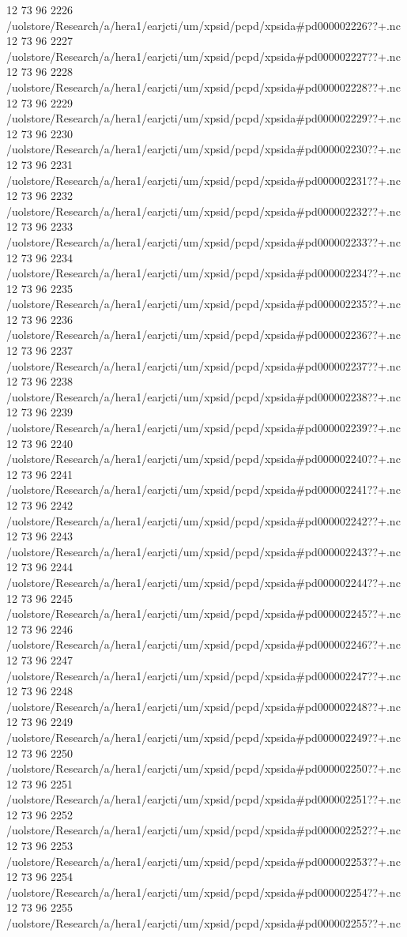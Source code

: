 12 73 96
2226
/uolstore/Research/a/hera1/earjcti/um/xpsid/pcpd/xpsida#pd000002226??+.nc
12 73 96
2227
/uolstore/Research/a/hera1/earjcti/um/xpsid/pcpd/xpsida#pd000002227??+.nc
12 73 96
2228
/uolstore/Research/a/hera1/earjcti/um/xpsid/pcpd/xpsida#pd000002228??+.nc
12 73 96
2229
/uolstore/Research/a/hera1/earjcti/um/xpsid/pcpd/xpsida#pd000002229??+.nc
12 73 96
2230
/uolstore/Research/a/hera1/earjcti/um/xpsid/pcpd/xpsida#pd000002230??+.nc
12 73 96
2231
/uolstore/Research/a/hera1/earjcti/um/xpsid/pcpd/xpsida#pd000002231??+.nc
12 73 96
2232
/uolstore/Research/a/hera1/earjcti/um/xpsid/pcpd/xpsida#pd000002232??+.nc
12 73 96
2233
/uolstore/Research/a/hera1/earjcti/um/xpsid/pcpd/xpsida#pd000002233??+.nc
12 73 96
2234
/uolstore/Research/a/hera1/earjcti/um/xpsid/pcpd/xpsida#pd000002234??+.nc
12 73 96
2235
/uolstore/Research/a/hera1/earjcti/um/xpsid/pcpd/xpsida#pd000002235??+.nc
12 73 96
2236
/uolstore/Research/a/hera1/earjcti/um/xpsid/pcpd/xpsida#pd000002236??+.nc
12 73 96
2237
/uolstore/Research/a/hera1/earjcti/um/xpsid/pcpd/xpsida#pd000002237??+.nc
12 73 96
2238
/uolstore/Research/a/hera1/earjcti/um/xpsid/pcpd/xpsida#pd000002238??+.nc
12 73 96
2239
/uolstore/Research/a/hera1/earjcti/um/xpsid/pcpd/xpsida#pd000002239??+.nc
12 73 96
2240
/uolstore/Research/a/hera1/earjcti/um/xpsid/pcpd/xpsida#pd000002240??+.nc
12 73 96
2241
/uolstore/Research/a/hera1/earjcti/um/xpsid/pcpd/xpsida#pd000002241??+.nc
12 73 96
2242
/uolstore/Research/a/hera1/earjcti/um/xpsid/pcpd/xpsida#pd000002242??+.nc
12 73 96
2243
/uolstore/Research/a/hera1/earjcti/um/xpsid/pcpd/xpsida#pd000002243??+.nc
12 73 96
2244
/uolstore/Research/a/hera1/earjcti/um/xpsid/pcpd/xpsida#pd000002244??+.nc
12 73 96
2245
/uolstore/Research/a/hera1/earjcti/um/xpsid/pcpd/xpsida#pd000002245??+.nc
12 73 96
2246
/uolstore/Research/a/hera1/earjcti/um/xpsid/pcpd/xpsida#pd000002246??+.nc
12 73 96
2247
/uolstore/Research/a/hera1/earjcti/um/xpsid/pcpd/xpsida#pd000002247??+.nc
12 73 96
2248
/uolstore/Research/a/hera1/earjcti/um/xpsid/pcpd/xpsida#pd000002248??+.nc
12 73 96
2249
/uolstore/Research/a/hera1/earjcti/um/xpsid/pcpd/xpsida#pd000002249??+.nc
12 73 96
2250
/uolstore/Research/a/hera1/earjcti/um/xpsid/pcpd/xpsida#pd000002250??+.nc
12 73 96
2251
/uolstore/Research/a/hera1/earjcti/um/xpsid/pcpd/xpsida#pd000002251??+.nc
12 73 96
2252
/uolstore/Research/a/hera1/earjcti/um/xpsid/pcpd/xpsida#pd000002252??+.nc
12 73 96
2253
/uolstore/Research/a/hera1/earjcti/um/xpsid/pcpd/xpsida#pd000002253??+.nc
12 73 96
2254
/uolstore/Research/a/hera1/earjcti/um/xpsid/pcpd/xpsida#pd000002254??+.nc
12 73 96
2255
/uolstore/Research/a/hera1/earjcti/um/xpsid/pcpd/xpsida#pd000002255??+.nc
